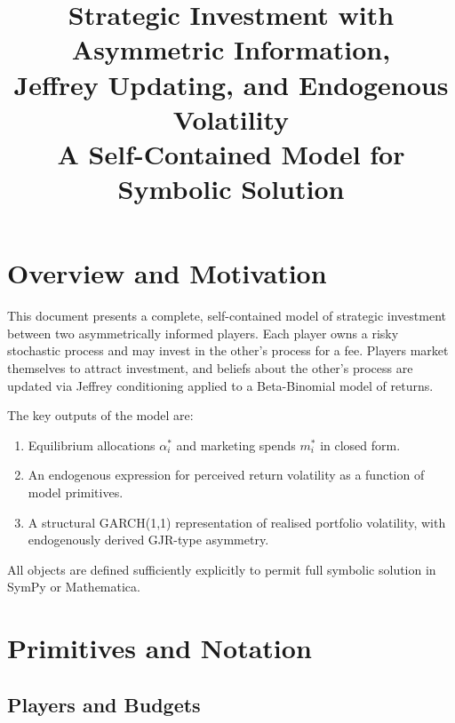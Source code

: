 \documentclass[12pt,a4paper]{article}
\newcommand{\1}{\mathbf{1}}
\begin{document}
\title{\textbf{Strategic Investment with Asymmetric Information,\\
Jeffrey Updating, and Endogenous Volatility}\\[0.5em]
\large A Self-Contained Model for Symbolic Solution}

\author{}
\date{}
\maketitle
\tableofcontents
\newpage

\section{Overview and Motivation}

This document presents a complete, self-contained model of strategic investment between two asymmetrically informed players. Each player owns a risky stochastic process and may invest in the other's process for a fee. Players market themselves to attract investment, and beliefs about the other's process are updated via Jeffrey conditioning applied to a Beta-Binomial model of returns.

The key outputs of the model are:
\begin{enumerate}[label=(\roman*)]
  \item Equilibrium allocations $\alpha_i^*$ and marketing spends $m_i^*$ in closed form.
  \item An endogenous expression for perceived return volatility as a function of model primitives.
  \item A structural GARCH(1,1) representation of realised portfolio volatility, with endogenously derived GJR-type asymmetry.
\end{enumerate}

All objects are defined sufficiently explicitly to permit full symbolic solution in SymPy or Mathematica.

\section{Primitives and Notation}

\subsection{Players and Budgets}
\end{document}

